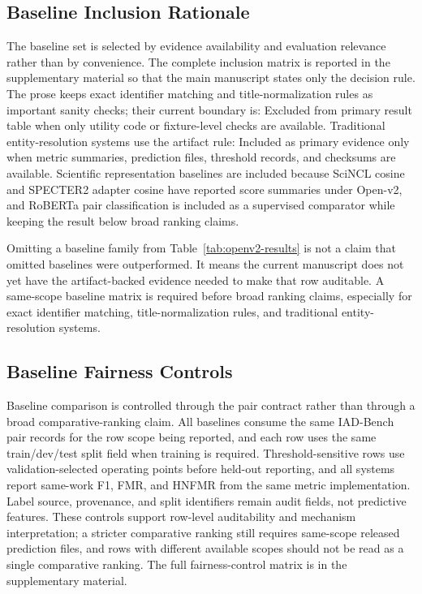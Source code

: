\documentclass[preprint,12pt]{elsarticle}
\begin{document}
\subsection{Baseline Inclusion Rationale}

The baseline set is selected by evidence availability and evaluation relevance rather than by convenience. The complete inclusion matrix is reported in the supplementary material so that the main manuscript states only the decision rule. The prose keeps exact identifier matching and title-normalization rules as important sanity checks; their current boundary is: Excluded from primary result table when only utility code or fixture-level checks are available. Traditional entity-resolution systems use the artifact rule: Included as primary evidence only when metric summaries, prediction files, threshold records, and checksums are available. Scientific representation baselines are included because SciNCL cosine and SPECTER2 adapter cosine have reported score summaries under Open-v2, and RoBERTa pair classification is included as a supervised comparator while keeping the result below broad ranking claims.

Omitting a baseline family from Table~\ref{tab:openv2-results} is not a claim that omitted baselines were outperformed. It means the current manuscript does not yet have the artifact-backed evidence needed to make that row auditable. A same-scope baseline matrix is required before broad ranking claims, especially for exact identifier matching, title-normalization rules, and traditional entity-resolution systems.

\subsection{Baseline Fairness Controls}

Baseline comparison is controlled through the pair contract rather than through a broad comparative-ranking claim. All baselines consume the same IAD-Bench pair records for the row scope being reported, and each row uses the same train/dev/test split field when training is required. Threshold-sensitive rows use validation-selected operating points before held-out reporting, and all systems report same-work F1, FMR, and HNFMR from the same metric implementation. Label source, provenance, and split identifiers remain audit fields, not predictive features. These controls support row-level auditability and mechanism interpretation; a stricter comparative ranking still requires same-scope released prediction files, and rows with different available scopes should not be read as a single comparative ranking. The full fairness-control matrix is in the supplementary material.
\end{document}
